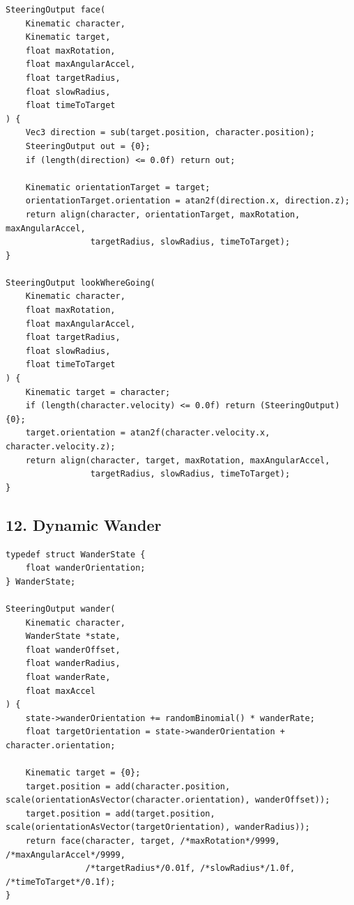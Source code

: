 \documentclass[10pt,letterpaper]{article}
\begin{document}
\begin{verbatim}
SteeringOutput face(
    Kinematic character,
    Kinematic target,
    float maxRotation,
    float maxAngularAccel,
    float targetRadius,
    float slowRadius,
    float timeToTarget
) {
    Vec3 direction = sub(target.position, character.position);
    SteeringOutput out = {0};
    if (length(direction) <= 0.0f) return out;

    Kinematic orientationTarget = target;
    orientationTarget.orientation = atan2f(direction.x, direction.z);
    return align(character, orientationTarget, maxRotation, maxAngularAccel,
                 targetRadius, slowRadius, timeToTarget);
}

SteeringOutput lookWhereGoing(
    Kinematic character,
    float maxRotation,
    float maxAngularAccel,
    float targetRadius,
    float slowRadius,
    float timeToTarget
) {
    Kinematic target = character;
    if (length(character.velocity) <= 0.0f) return (SteeringOutput){0};
    target.orientation = atan2f(character.velocity.x, character.velocity.z);
    return align(character, target, maxRotation, maxAngularAccel,
                 targetRadius, slowRadius, timeToTarget);
}
\end{verbatim}

\subsection*{12. Dynamic Wander}
{}

\begin{verbatim}
typedef struct WanderState {
    float wanderOrientation;
} WanderState;

SteeringOutput wander(
    Kinematic character,
    WanderState *state,
    float wanderOffset,
    float wanderRadius,
    float wanderRate,
    float maxAccel
) {
    state->wanderOrientation += randomBinomial() * wanderRate;
    float targetOrientation = state->wanderOrientation + character.orientation;

    Kinematic target = {0};
    target.position = add(character.position, scale(orientationAsVector(character.orientation), wanderOffset));
    target.position = add(target.position, scale(orientationAsVector(targetOrientation), wanderRadius));
    return face(character, target, /*maxRotation*/9999, /*maxAngularAccel*/9999,
                /*targetRadius*/0.01f, /*slowRadius*/1.0f, /*timeToTarget*/0.1f);
}
\end{verbatim}
\end{document}
